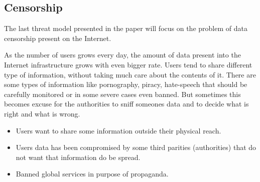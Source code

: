 \subsection{Censorship}
The last threat model presented in the paper will focus on the problem of data censorship present on the Internet.

As the number of users grows every day, the amount of data present into the Internet infrastructure grows with even bigger rate. Users tend to share different type of information, without taking much care about the contents of it. There are some types of information like pornography, piracy, hate-speech  that should be carefully monitored or in some severe cases even banned. But sometimes this becomes excuse for the authorities to sniff someones data and to decide what is right and what is wrong.

\begin{itemize}
  \item Users want to share some information outside their physical reach.
  \item Users data has been compromised by some third parities (authorities) that do not want that information do be spread.
  \item Banned global services in purpose of propaganda.
\end{itemize}

